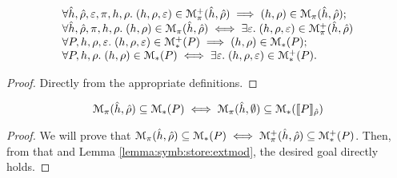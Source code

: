 \begin{lemma}\label{lemma:connect:models}
$$
\begin{array}{l}
\forall \hat{h}, \hat\rho, \varepsilon, \pi, h, \rho. \; (h, \rho, \varepsilon) \in \mathcal{M}_{\pi}^+(\hat{h}, \hat\rho) \implies (h, \rho) \in \mathcal{M}_{\pi}(\hat{h}, \hat\rho); \\
\forall \hat{h}, \hat\rho, \pi, h, \rho. \; (h, \rho) \in \mathcal{M}_{\pi}(\hat{h}, \hat\rho) \iff \exists \varepsilon. \; (h, \rho, \varepsilon) \in \mathcal{M}_{\pi}^+(\hat{h}, \hat\rho)
\\
\forall P, h, \rho, \varepsilon. \; (h, \rho, \varepsilon) \in \mathcal{M}_{*}^+(P) \implies (h, \rho) \in \mathcal{M}_{*}(P); \\
\forall P, h, \rho. \; (h, \rho) \in \mathcal{M}_{*}(P) \iff \exists \varepsilon. \; (h, \rho, \varepsilon) \in \mathcal{M}_{*}^+(P).
\end{array}
$$
\end{lemma}
\begin{proof}
Directly from the appropriate definitions.
\end{proof}

\begin{lemma}\label{lemma:symb:store}
$$
\mathcal{M}_{\pi}(\hat{h}, \hat\rho) \subseteq \mathcal{M}_{*}(P) 
    \iff 
    \mathcal{M}_{\pi}(\hat{h}, \emptyset) \subseteq \mathcal{M}_{*}(\llbracket P \rrbracket_{\hat\rho}) 
$$
\end{lemma}
\begin{proof}
We will prove that $\mathcal{M}_{\pi}(\hat{h}, \hat\rho) \subseteq \mathcal{M}_{*}(P) \iff \mathcal{M}_{\pi}^+(\hat{h}, \hat\rho) \subseteq \mathcal{M}_{*}^+(P) $. Then, from that and Lemma \ref{lemma:symb:store:extmod}, the desired goal directly holds.


\end{proof}







